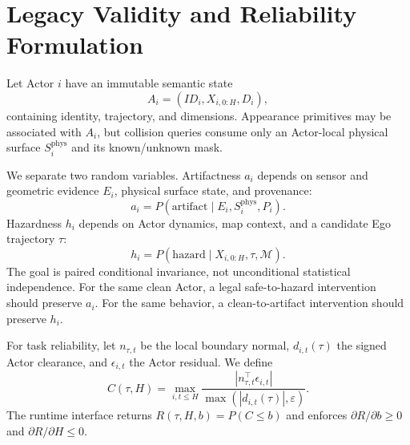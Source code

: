 \section{Legacy Validity and Reliability Formulation}

Let Actor $i$ have an immutable semantic state
\begin{equation}
A_i=(ID_i,X_{i,0:H},D_i),
\end{equation}
containing identity, trajectory, and dimensions. Appearance primitives may be associated with $A_i$, but collision queries consume only an Actor-local physical surface $S_i^{\mathrm{phys}}$ and its known/unknown mask.

We separate two random variables. Artifactness $a_i$ depends on sensor and geometric evidence $E_i$, physical surface state, and provenance:
\begin{equation}
a_i=P(\mathrm{artifact}\mid E_i,S_i^{\mathrm{phys}},P_i).
\end{equation}
Hazardness $h_i$ depends on Actor dynamics, map context, and a candidate Ego trajectory $\tau$:
\begin{equation}
h_i=P(\mathrm{hazard}\mid X_{i,0:H},\tau,\mathcal{M}).
\end{equation}
The goal is paired conditional invariance, not unconditional statistical independence. For the same clean Actor, a legal safe-to-hazard intervention should preserve $a_i$. For the same behavior, a clean-to-artifact intervention should preserve $h_i$.

For task reliability, let $n_{\tau,t}$ be the local boundary normal, $d_{i,t}(\tau)$ the signed Actor clearance, and $\epsilon_{i,t}$ the Actor residual. We define
\begin{equation}
C(\tau,H)=\max_{i,t\le H}\frac{|n_{\tau,t}^{\top}\epsilon_{i,t}|}{\max(|d_{i,t}(\tau)|,\varepsilon)}.
\label{eq:boundary-cost}
\end{equation}
The runtime interface returns $R(\tau,H,b)=P(C\le b)$ and enforces $\partial R/\partial b\ge0$ and $\partial R/\partial H\le0$.
